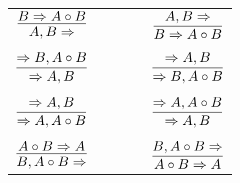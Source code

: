 \documentclass[11pt]{article}
\begin{document}
\begin{center}
\begin{tabular}{ccc}
$\infer{A, B\Rightarrow }{B\Rightarrow A\circ B}$ & \ \ \ \ & $\infer{B\Rightarrow A\circ B}{A, B\Rightarrow }$ \\
&& \\
$\infer{\Rightarrow A, B}{\Rightarrow B, A\circ B}$ && $\infer{\Rightarrow B, A\circ B}{\Rightarrow A, B}$ \\
&& \\
$\infer{\Rightarrow A, A\circ B}{\Rightarrow A, B}$ && $\infer{\Rightarrow A, B}{\Rightarrow A, A\circ B}$ \\
&& \\
$\infer{B, A\circ B\Rightarrow }{A\circ B\Rightarrow A}$ && $\infer{A\circ B\Rightarrow A}{B, A\circ B\Rightarrow }$ \\
\end{tabular}



\end{center}
\end{document}
